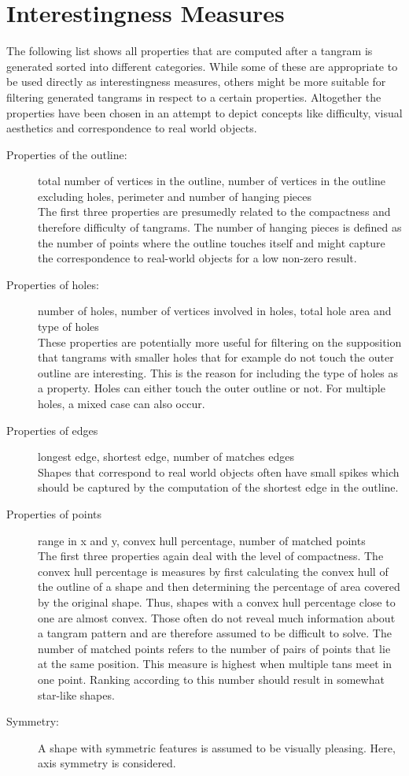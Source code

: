 \section{Interestingness Measures}
\label{interesting}
The following list shows all properties that are computed after a tangram is generated sorted into different categories. While some of these are appropriate to be used directly as interestingness measures, others might be more suitable for filtering generated tangrams in respect to a certain properties. Altogether the properties have been chosen in an attempt to depict concepts like difficulty, visual aesthetics and correspondence to real world objects. 
\begin{description}
  \item[Properties of the outline:] total number of vertices in the outline, number of vertices in the outline excluding holes, perimeter and number of hanging pieces \\
  	The first three properties are presumedly related to the compactness and therefore difficulty of tangrams. The number of hanging pieces is defined as the number of points where the outline touches itself and might capture the correspondence to real-world objects for a low non-zero result. 
  \item[Properties of holes:] number of holes, number of vertices involved in holes, total hole area and type of holes \\
  	These properties are potentially more useful for filtering on the supposition that tangrams with smaller holes that for example do not touch the outer outline are interesting. This is the reason for including the type of holes as a property. Holes can either touch the outer outline or not. For multiple holes, a mixed case can also occur.  
  \item[Properties of edges] longest edge, shortest edge, number of matches edges \\
  	Shapes that correspond to real world objects often have small spikes which should be captured by the computation of the shortest edge in the outline.
  \item[Properties of points] range in x and y, convex hull percentage, number of matched points \\
  	The first three properties again deal with the level of compactness. The convex hull percentage is measures by first calculating the convex hull of the outline of a shape and then determining the percentage of area covered by the original shape. Thus, shapes with a convex hull percentage close to one are almost convex. Those often do not reveal much information about a tangram pattern and are therefore assumed to be difficult to solve. 
  	The number of matched points refers to the number of pairs of points that lie at the same position. This measure is highest when multiple tans meet in one point. Ranking according to this number should result in somewhat star-like shapes. 
   \item[Symmetry:] A shape with symmetric features is assumed to be visually pleasing. Here, axis symmetry is considered. 
\end{description}

